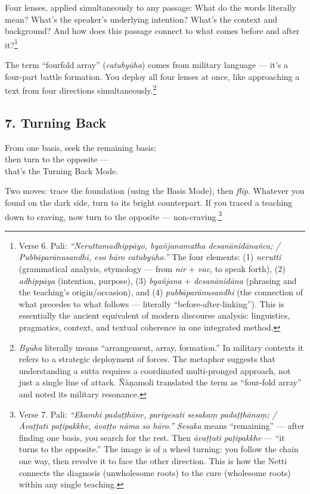 Four lenses, applied simultaneously to any passage: What do the words literally mean? What's the speaker's underlying intention? What's the context and background? And how does this passage connect to what comes before and after it?\footnote{Verse 6. Pali: \textit{``Neruttamadhippāyo, byañjanamatha desanānidānañca; / Pubbāparānusandhī, eso hāro catubyūho.''} The four elements: (1) \textit{nerutti} (grammatical analysis, etymology --- from \textit{nir} + \textit{vac}, to speak forth), (2) \textit{adhippāya} (intention, purpose), (3) \textit{byañjana} + \textit{desanānidāna} (phrasing and the teaching's origin/occasion), and (4) \textit{pubbāparānusandhi} (the connection of what precedes to what follows --- literally ``before-after-linking''). This is essentially the ancient equivalent of modern discourse analysis: linguistics, pragmatics, context, and textual coherence in one integrated method.}

The term ``fourfold array'' (\textit{catubyūha}) comes from military language --- it's a four-part battle formation. You deploy all four lenses at once, like approaching a text from four directions simultaneously.\footnote{\textit{Byūha} literally means ``arrangement, array, formation.'' In military contexts it refers to a strategic deployment of forces. The metaphor suggests that understanding a sutta requires a coordinated multi-pronged approach, not just a single line of attack. Ñāṇamoli translated the term as ``four-fold array'' and noted its military resonance.}

\subsection*{7. Turning Back}

\begin{versebox}
From one basis, seek the remaining basis;\\
then turn to the opposite ---\\
that's the Turning Back Mode.
\end{versebox}

Two moves: trace the foundation (using the Basis Mode), then \textit{flip}. Whatever you found on the dark side, turn to its bright counterpart. If you traced a teaching down to craving, now turn to the opposite --- non-craving.\footnote{Verse 7. Pali: \textit{``Ekamhi padaṭṭhāne, pariyesati sesakaṃ padaṭṭhānaṃ; / Āvaṭṭati paṭipakkhe, āvaṭṭo nāma so hāro.''} \textit{Sesaka} means ``remaining'' --- after finding one basis, you search for the rest. Then \textit{āvaṭṭati paṭipakkhe} --- ``it turns to the opposite.'' The image is of a wheel turning: you follow the chain one way, then revolve it to face the other direction. This is how the Netti connects the diagnosis (unwholesome roots) to the cure (wholesome roots) within any single teaching.}

